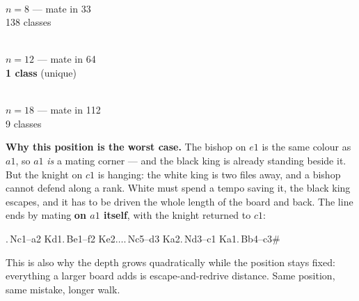 \documentclass[11pt]{article}
\begin{document}
\begin{center}
\begin{minipage}[b]{0.24\textwidth}\centering
  \\[1.5mm]
  {\small $n=8$ --- mate in 33\\ 138 classes}
\end{minipage}\hfill
\begin{minipage}[b]{0.33\textwidth}\centering
  \\[1.5mm]
  {\small $n=12$ --- mate in 64\\ \textbf{1 class} (unique)}
\end{minipage}\hfill
\begin{minipage}[b]{0.40\textwidth}\centering
  \\[1.5mm]
  {\small $n=18$ --- mate in 112\\ 9 classes}
\end{minipage}
\end{center}

\medskip

\medskip
\noindent\textbf{Why this position is the worst case.} The bishop on $e1$ is the
same colour as $a1$, so $a1$ \emph{is} a mating corner --- and the black king is
already standing beside it. But the knight on $c1$ is hanging: the white king is
two files away, and a bishop cannot defend along a rank. White must spend a
tempo saving it, the black king escapes, and it has to be driven the whole
length of the board and back. The line ends by mating \textbf{on $a1$ itself},
with the knight returned to $c1$:

\begin{center}\small{}.\,Nc1--a2 Kd1.\,Be1--f2 Ke2\quad $\ldots$.\,Nc5--d3 Ka2.\,Nd3--c1 Ka1.\,Bb4--c3\#
\end{center}

\noindent
This is also why the depth grows quadratically while the position stays fixed:
everything a larger board adds is escape-and-redrive distance. Same position,
same mistake, longer walk.

\end{document}
